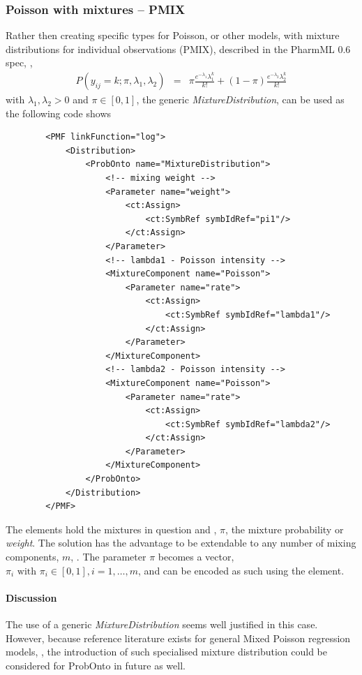 \subsubsection{Poisson with mixtures -- PMIX}
Rather then creating specific types for Poisson, or other models, with mixture distributions for 
individual observations (PMIX), described in the PharmML 0.6 spec, \cite{Pharmml_06},
\begin{eqnarray}
P(y_{ij} = k;\pi,\lambda_1,\lambda_2) &=& \pi \frac{e^{-\lambda_1} \lambda_1^k}{k!} + (1-\pi) \frac{e^{-\lambda_2} \lambda_2^k}{k!} \nonumber
\end{eqnarray}
with $\lambda_1, \lambda_2 > 0$ and $\pi \in [0,1]$, the generic \emph{MixtureDistribution}, 
can be used as the following code shows
\lstset{language=XML}
\begin{lstlisting}
        <PMF linkFunction="log">
            <Distribution>
                <ProbOnto name="MixtureDistribution">
                    <!-- mixing weight -->
                    <Parameter name="weight">
                        <ct:Assign>
                            <ct:SymbRef symbIdRef="pi1"/>
                        </ct:Assign>
                    </Parameter>
                    <!-- lambda1 - Poisson intensity -->
                    <MixtureComponent name="Poisson">
                        <Parameter name="rate">
                            <ct:Assign>
                                <ct:SymbRef symbIdRef="lambda1"/>
                            </ct:Assign>
                        </Parameter>
                    </MixtureComponent>
                    <!-- lambda2 - Poisson intensity -->
                    <MixtureComponent name="Poisson">
                        <Parameter name="rate">
                            <ct:Assign>
                                <ct:SymbRef symbIdRef="lambda2"/>
                            </ct:Assign>
                        </Parameter>
                    </MixtureComponent>
                </ProbOnto>
            </Distribution>
        </PMF>
\end{lstlisting}
The  elements hold the mixtures in question and 
, $\pi$, the mixture probability or \emph{weight}. The solution has the advantage 
to be extendable to any number of mixing components, $m$, \cite{Forbes:2010jk}. 
The parameter $\pi$ becomes a vector, $\pi_i \text{ with } \pi_i \in [0,1], i=1,\dots,m$, 
and can be encoded as such using the  element.
\paragraph{Discussion}
The use of a generic \emph{MixtureDistribution} seems well justified in this case. 
However, because reference literature exists for general Mixed Poisson regression models, 
\cite{Wang:1996fj}, the introduction of such specialised mixture distribution 
could be considered for ProbOnto in future as well.



